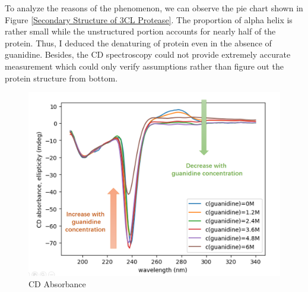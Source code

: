 \documentclass{report}
\begin{document}
To analyze the reasons of the phenomenon, we can observe the pie chart shown in Figure \ref{Secondary Structure of 3CL Protease}.
The proportion of alpha helix is rather small while the unstructured portion accounts for nearly half of the protein.
Thus, I deduced the denaturing of protein even in the absence of guanidine.
Besides, the CD spectroscopy could not provide extremely accurate measurement which could only verify assumptions rather than figure out the protein structure from bottom.



\begin{figure}
    \centering
    \includegraphics[width=0.8\linewidth]{../Figures/CD absorbance.png}
    \caption{CD Absorbance}
    \label{CD Absorbance}
\end{figure}
\end{document}
